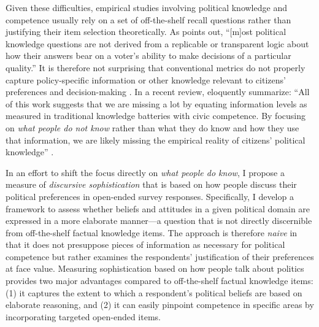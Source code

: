 Given these difficulties, empirical studies involving political knowledge and competence usually rely on a set of off-the-shelf recall questions rather than justifying their item selection theoretically. As \citet[219]{lupia2006elitism} points out, ``[m]ost political knowledge questions are not derived from a replicable or transparent logic about how their answers bear on a voter's ability to make decisions of a particular quality.'' It is therefore not surprising that conventional metrics do not properly capture policy-specific information \citep{gilens2001political} or other knowledge relevant to citizens' preferences and decision-making \citep[43--68]{graber2001processing}. In a recent review, \citeauthor{cramer2017fact} eloquently summarize: ``All of this work suggests that we are missing a lot by equating information levels as measured in traditional knowledge batteries with civic competence. By focusing on \textit{what people do not know} rather than what they do know and how they use that information, we are likely missing the empirical reality of citizens' political knowledge'' \citeyearpar[756, emphasis added]{cramer2017fact}.

In an effort to shift the focus directly on \textit{what people do know}, I propose a measure of \textit{discursive sophistication} that is based on how people discuss their political preferences in open-ended survey responses. Specifically, I develop a framework to assess whether beliefs and attitudes in a given political domain are expressed in a more elaborate manner---a question that is not directly discernible from off-the-shelf factual knowledge items. The approach is therefore \textit{naive} in that it does not presuppose pieces of information as necessary for political competence but rather examines the respondents' justification of their preferences at face value. Measuring sophistication based on how people talk about politics provides two major advantages compared to off-the-shelf factual knowledge items: (1) it captures the extent to which a respondent's political beliefs are based on elaborate reasoning, and (2) it can easily pinpoint competence in specific areas by incorporating targeted open-ended items.

